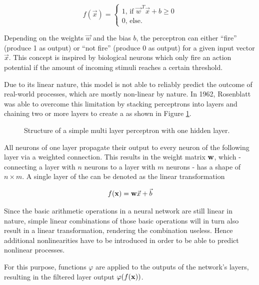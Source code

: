 	\begin{equation}
	\label{eq:rosenblatt-perceptron}
	f(\vec{x}) =
	\begin{cases}
	1\text{, if } \vec{w}^{\,T}\vec{x} + b \geq 0 \\
	0\text{, else.}
	\end{cases}
	\end{equation}
	
	Depending on the weights $\vec{w}$ and the bias $b$, the perceptron can either "`fire"' (produce 1 as output) or "`not fire"' (produce 0 as output) for a given input vector $\vec{x}$. This concept is inspired by biological neurons which only fire an action potential if the amount of incoming stimuli reaches a certain threshold.
	
	Due to its linear nature, this model is not able to reliably predict the outcome of real-world processes, which are mostly non-linear by nature. In 1962, Rosenblatt was able to overcome this limitation by stacking perceptrons into layers and chaining two or more layers to create a  \cite{ROSENBLATT1961} as shown in Figure \ref{fig:mlp}. 
	
	\begin{figure}
		
		\centering
		\caption{Structure of a simple multi layer perceptron with one hidden layer.}
		\label{fig:mlp}
	\end{figure}
	
	All neurons of one layer propagate their output to every neuron of the following layer via a weighted connection. This results in the weight matrix $\mathbf{w}$, which - connecting a layer with $n$ neurons to a layer with $m$ neurons - has a shape of $n\times m$. A single layer of the  can be denoted as the linear transformation
	
	\begin{equation}
		f(\mathbf{x}) = \mathbf{w}\vec{x} + \vec{b} 
	\end{equation}
	
	
	
	Since the basic arithmetic operations in a neural network are still linear in nature, simple linear combinations of those basic operations will in turn also result in a linear transformation, rendering the combination useless. Hence additional nonlinearities have to be introduced in order to be able to predict nonlinear processes. 
	
	For this purpose, functions $\varphi$ are applied to the outputs of the network's layers, resulting in the filtered layer output $\varphi(f(\mathbf{x}))$.
	
